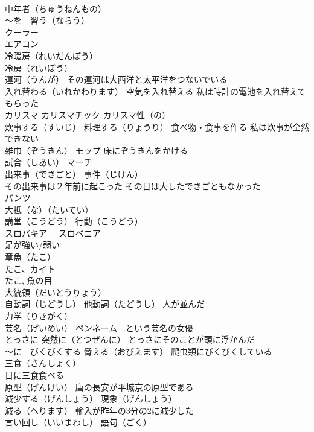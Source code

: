 \documentclass[8pt]{extreport}
\begin{document}
\begin{CJK}{UTF8}{min}
\\	中年者（ちゅうねんもの）
\\	～を　習う（ならう） 
\\	クーラー 
\\	エアコン 
\\	冷暖房（れいだんぼう） 
\\	冷房（れいぼう） 
\\	運河（うんが） その運河は大西洋と太平洋をつないでいる
\\	入れ替わる（いれかわります） 空気を入れ替える 私は時計の電池を入れ替えてもらった
\\	カリスマ カリスマチック カリスマ性（の）
\\	炊事する（すいじ） 料理する（りょうり） 食べ物・食事を作る 私は炊事が全然できない
\\	雑巾（ぞうきん） モップ 床にぞうきんをかける
\\	試合（しあい） マーチ
\\	出来事（できごと） 事件（じけん）
\\	その出来事は２年前に起こった その日は大したできごともなかった
\\	パンツ
\\	大抵（な）（たいてい）
\\	講堂（こうどう） 行動（こうどう）
\\	スロバキア　 スロベニア
\\	足が強い/弱い
\\	章魚（たこ） 
\\	たこ、カイト 
\\	たこ, 魚の目
\\	大統領（だいとうりょう）
\\	自動詞（じどうし） 他動詞（たどうし） 人が並んだ
\\	力学（りきがく）
\\	芸名（げいめい） ペンネーム …という芸名の女優
\\	とっさに 突然に（とつぜんに） とっさにそのことが頭に浮かんだ
\\	～に　びくびくする 脅える（おびえます） 爬虫類にびくびくしている
\\	三食（さんしょく） 
\\	日に三食食べる
\\	原型（げんけい） 唐の長安が平城京の原型である
\\	減少する（げんしょう） 現象（げんしょう）
\\	減る（へります） 輸入が昨年の3分の2に減少した
\\	言い回し（いいまわし） 語句（ごく） 

\end{CJK}
\end{document}
